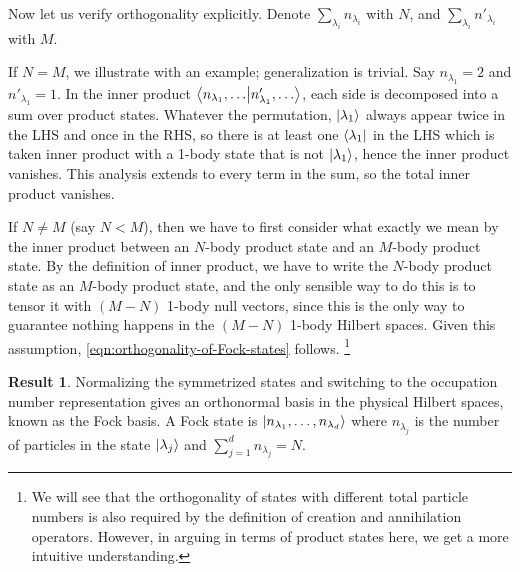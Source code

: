 \documentclass{article}
\theoremstyle{definition}
\newtheorem{res}{Result}[section]
\theoremstyle{plain}
\numberwithin{equation}{section}
\begin{document}
    Now let us verify orthogonality explicitly. 
    Denote $\sum_{\lambda_{i}}n_{\lambda_{i}}$ with $N$, and
    $\sum_{\lambda_{i}}n'_{\lambda_{i}}$ with $M$.

    If $N=M$, we illustrate with an example; 
    generalization is trivial. Say 
    $n_{\lambda_{1}}=2$ and $n'_{\lambda_{1}}=1$. 
    In the inner product $\bra{n_{\lambda_{1}}, \ldots }\ket{n'_{\lambda_{1}}, \ldots }$, each side is decomposed into a sum over product states. 
    Whatever the permutation, $\ket{\lambda_1}$ always appear 
    twice in the LHS and once in the RHS, so there is at least 
    one $\bra{\lambda_{1}}$ in the LHS which is taken inner product with 
    a 1-body state that is not $\ket{\lambda_{1}}$, hence 
    the inner product vanishes. 
    This analysis extends to every term in the sum, 
    so the total inner product vanishes.

    If $N \neq M$ (say $N<M$), then we have to first consider 
    what exactly we mean by the inner product between 
    an $N$-body product state and an $M$-body product state. 
    By the definition of inner product, 
    we have to write the $N$-body product state 
    as an $M$-body product state, and the only sensible way 
    to do this is to tensor it with $(M-N)$ 1-body null vectors, 
    since this is the only way to guarantee nothing happens 
    in the $(M-N)$ 1-body Hilbert spaces. 
    Given this assumption, 
    \cref{eqn:orthogonality-of-Fock-states} follows. 
    \footnote{
        We will see that the orthogonality of states 
        with different total particle numbers 
        is also required by the definition of 
        creation and annihilation operators. 
        However, in arguing in terms of product states here, 
        we get a more intuitive understanding. 
    }


    \begin{graybox}
    \begin{res}
        Normalizing the symmetrized states and 
        switching to the occupation number representation 
        gives an orthonormal basis in the physical Hilbert spaces, 
        known as the Fock basis. A Fock state is 
        $\ket{n_{\lambda_{1}}, \ldots ,n_{\lambda_{d}}}$ 
        where $n_{\lambda_{j}}$ is the number of particles 
        in the state $\ket{\lambda_{j}}$ and 
        $\sum_{j=1}^{d}n_{\lambda_{j}}=N$.
    \end{res}
    \end{graybox}
\end{document}
